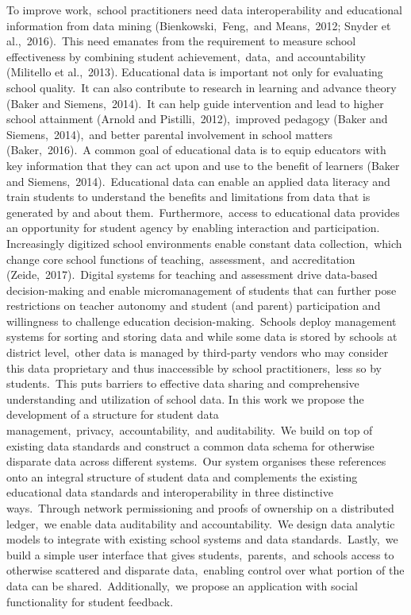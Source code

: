 \documentclass{article}
\begin{document}
To improve work,\ school practitioners need data interoperability and educational information from data mining (Bienkowski,\ Feng,\ and Means,\ 2012; Snyder et al.,\ 2016).\ This need emanates from the requirement to measure school effectiveness by combining student achievement,\ data,\ and accountability (Militello et al.,\ 2013).
\bigbreak
Educational data is important not only for evaluating school quality.\ It can also contribute to research in learning and advance theory (Baker and Siemens,\ 2014).\ It can help guide intervention and lead to higher school attainment (Arnold and Pistilli,\ 2012),\ improved pedagogy (Baker and Siemens,\ 2014),\ and better parental involvement in school matters (Baker,\ 2016).\ A common goal of educational data is to equip educators with key information that they can act upon and use to the benefit of learners (Baker and Siemens,\ 2014).\ Educational data can enable an applied data literacy and train students to understand the benefits and limitations from data that is generated by and about them.\ Furthermore,\ access to educational data provides an opportunity for student agency by enabling interaction and participation.
\bigbreak
Increasingly digitized school environments enable constant data collection,\ which change core school functions of teaching,\ assessment,\ and accreditation (Zeide,\ 2017).\ Digital systems for teaching and assessment drive data-based decision-making and enable micromanagement of students that can further pose restrictions on teacher autonomy and student (and parent) participation and willingness to challenge education decision-making.\ Schools deploy management systems for sorting and storing data and while some data is stored by schools at district level,\ other data is managed by third-party vendors who may consider this data proprietary and thus inaccessible by school practitioners,\ less so by students.\ This puts barriers to effective data sharing and comprehensive understanding and utilization of school data.
\bigbreak
In this work we propose the development of a structure for student data management,\ privacy,\ accountability,\ and auditability.\ We build on top of existing data standards and construct a common data schema for otherwise disparate data across different systems.\ Our system organises these references onto an integral structure of student data and complements the existing educational data standards and interoperability in three distinctive ways.\ Through network permissioning and proofs of ownership on a distributed ledger,\ we enable data auditability and accountability.\ We design data analytic models to integrate with existing school systems and data standards.\ Lastly,\ we build a simple user interface that gives students,\ parents,\ and schools access to otherwise scattered and disparate data,\ enabling control over what portion of the data can be shared.\ Additionally,\ we propose an application with social functionality for student feedback.\ 
\end{document}
